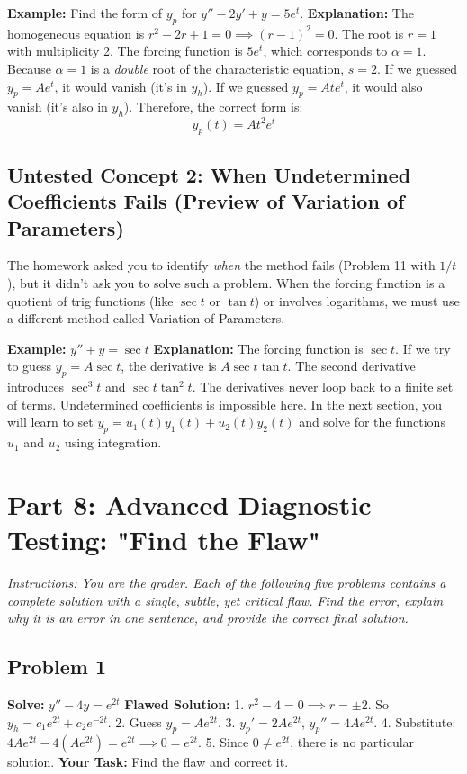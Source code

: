 \documentclass[12pt]{article}
\begin{document}
\textbf{Example:} Find the form of $y_p$ for $y'' - 2y' + y = 5e^t$.
\textbf{Explanation:} 
The homogeneous equation is $r^2 - 2r + 1 = 0 \implies (r-1)^2 = 0$. The root is $r=1$ with multiplicity 2.
The forcing function is $5e^t$, which corresponds to $\alpha = 1$.
Because $\alpha=1$ is a \textit{double} root of the characteristic equation, $s=2$.
If we guessed $y_p = A e^t$, it would vanish (it's in $y_h$).
If we guessed $y_p = A t e^t$, it would also vanish (it's also in $y_h$).
Therefore, the correct form is:
\[ y_p(t) = A t^2 e^t \]

\subsection{Untested Concept 2: When Undetermined Coefficients Fails (Preview of Variation of Parameters)}
The homework asked you to identify \textit{when} the method fails (Problem 11 with $1/t$), but it didn't ask you to solve such a problem. When the forcing function is a quotient of trig functions (like $\sec t$ or $\tan t$) or involves logarithms, we must use a different method called Variation of Parameters.

\textbf{Example:} $y'' + y = \sec t$
\textbf{Explanation:} 
The forcing function is $\sec t$. If we try to guess $y_p = A \sec t$, the derivative is $A \sec t \tan t$. The second derivative introduces $\sec^3 t$ and $\sec t \tan^2 t$. The derivatives never loop back to a finite set of terms. Undetermined coefficients is impossible here. In the next section, you will learn to set $y_p = u_1(t)y_1(t) + u_2(t)y_2(t)$ and solve for the functions $u_1$ and $u_2$ using integration.

\newpage
\section{Part 8: Advanced Diagnostic Testing: "Find the Flaw"}
\textit{Instructions: You are the grader. Each of the following five problems contains a complete solution with a single, subtle, yet critical flaw. Find the error, explain why it is an error in one sentence, and provide the correct final solution.}

\subsection{Problem 1}
\textbf{Solve:} $y'' - 4y = e^{2t}$
\textbf{Flawed Solution:}
1. $r^2 - 4 = 0 \implies r = \pm 2$. So $y_h = c_1 e^{2t} + c_2 e^{-2t}$.
2. Guess $y_p = A e^{2t}$.
3. $y_p' = 2A e^{2t}$, $y_p'' = 4A e^{2t}$.
4. Substitute: $4A e^{2t} - 4(A e^{2t}) = e^{2t} \implies 0 = e^{2t}$.
5. Since $0 \neq e^{2t}$, there is no particular solution.
\textbf{Your Task:} Find the flaw and correct it.
\end{document}
